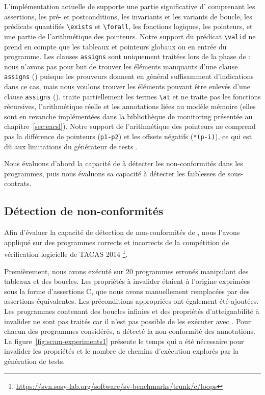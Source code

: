 L'implémentation actuelle de \stady supporte une partie significative d'\eacsl
comprenant les assertions, les pré- et postconditions, les invariants et les
variants de boucle, les prédicats quantifiés \lstinline[style=c]'\exists' et
\lstinline[style=c]'\forall', les fonctions logiques, les pointeurs, et une
partie de l'arithmétique des pointeurs.
Notre support du prédicat \lstinline'\valid' ne prend en compte que les tableaux
et pointeurs globaux ou en entrée du programme.
Les clauses \lstinline'assigns' sont uniquement traitées lors de la phase de
\SWD : nous n'avons pas pour but de trouver les éléments manquants d'une clause
\lstinline'assigns' (\NCD) puisque les prouveurs donnent en général
suffisamment d'indications dans ce cas, mais nous voulons trouver les éléments
pouvant être enlevés d'une clause \lstinline'assigns' (\SWD).
\stady traite partiellement les termes \lstinline'\at' et ne traite pas les
fonctions récursives, l'arithmétique réelle et les annotations liées au modèle
mémoire (elles sont en revanche implémentées dans la bibliothèque de monitoring
présentée au chapitre~\ref{sec:eacsl}).
Notre support de l'arithmétique des pointeurs ne comprend pas la différence de
pointeurs (\lstinline'p1-p2') et les offsets négatifs (\lstinline'*(p-i)'), ce
qui est dû aux limitations du générateur de tests \pathcrawler.

Nous évaluons d'abord la capacité de \stady à détecter les non-conformités dans
les programmes, puis nous évaluons sa capacité à détecter les faiblesses de
sous-contrats.


\subsection{Détection de non-conformités}


Afin d'évaluer la capacité de détection de non-conformités de \stady, nous
l'avons appliqué sur des programmes corrects et incorrects de la compétition
de vérification logicielle de TACAS 2014 \footnote{
  \url{https://svn.sosy-lab.org/software/sv-benchmarks/trunk/c/loops}
}.

Premièrement, nous avons exécuté \stady sur 20 programmes erronés manipulant des
tableaux et des boucles.
Les propriétés à invalider étaient à l'origine exprimées sous la forme
d'assertions C, que nous avons manuellement remplacées par des assertions \eacsl
équivalentes.
Les préconditions \eacsl appropriées ont également été ajoutées.
Les programmes contenant des boucles infinies et des propriétés d'atteignabilité
à invalider ne sont pas traités car il n'est pas possible de les exécuter avec
\pathcrawler.
Pour chacun des programmes considérés, \stady a détecté la non-conformité des
annotations.
La figure~\ref{fig:scam-experiments1} présente le temps qui a été nécessaire
pour invalider les propriétés et le nombre de chemins d'exécution explorés par
la génération de tests. 

